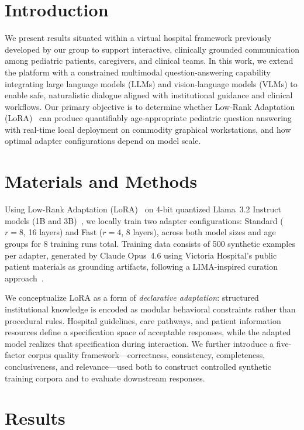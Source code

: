\documentclass[conference]{IEEEtran}
\begin{document}
\section{Introduction}

We present results situated within a virtual hospital framework previously developed by our group to support interactive, clinically grounded communication among pediatric patients, caregivers, and clinical teams. In this work, we extend the platform with a constrained multimodal question-answering capability integrating large language models (LLMs) and vision-language models (VLMs) to enable safe, naturalistic dialogue aligned with institutional guidance and clinical workflows. Our primary objective is to determine whether Low-Rank Adaptation (LoRA)~\cite{hu2022lora} can produce quantifiably age-appropriate pediatric question answering~\cite{flesch1948,gunning1952,senter1967,mclaughlin1969,kincaid1974,kincaid1975,coleman1975} with real-time local deployment on commodity graphical workstations, and how optimal adapter configurations depend on model scale.

\section{Materials and Methods}

Using Low-Rank Adaptation (LoRA)~\cite{hu2022lora} on 4-bit quantized Llama~3.2 Instruct models (1B and 3B)~\cite{dettmers2023}, we locally train two adapter configurations: Standard ($r{=}8$, 16 layers) and Fast ($r{=}4$, 8 layers), across both model sizes and age groups for 8 training runs total. Training data consists of 500 synthetic examples per adapter, generated by Claude Opus~4.6 using Victoria Hospital's public patient materials as grounding artifacts, following a LIMA-inspired curation approach~\cite{zhou2023lima}.

We conceptualize LoRA as a form of \textit{declarative adaptation}: structured institutional knowledge is encoded as modular behavioral constraints rather than procedural rules. Hospital guidelines, care pathways, and patient information resources define a specification space of acceptable responses, while the adapted model realizes that specification during interaction. We further introduce a five-factor corpus quality framework---correctness, consistency, completeness, conclusiveness, and relevance---used both to construct controlled synthetic training corpora and to evaluate downstream responses.

\section{Results}
\end{document}
